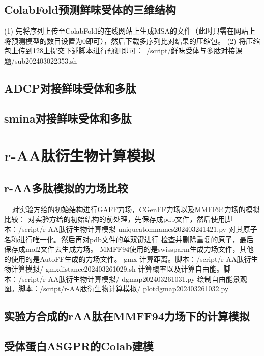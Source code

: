 \subsection{ColabFold预测鲜味受体的三维结构}
(1) 先将序列上传至ColabFold的在线网站上生成MSA的文件（此时只需在网站上将预测模型的数目设置为0即可），然后下载多序列比对结果的压缩包。
\newline\indent (2) 将压缩包上传到128上提交下述脚本进行预测即可：~/script/鲜味受体与多肽对接课题/sub202403022353.sh
\subsection{ADCP对接鲜味受体和多肽}
\subsection{smina对接鲜味受体和多肽}
\section{r-AA肽衍生物计算模拟}
\subsection{r-AA多肽模拟的力场比较}
\noindent = 对实验方给的初始结构进行GAFF力场，CGenFF力场以及MMFF94力场的模拟比较：
\newline\indent 对实验方给的初始结构的前处理，先保存成pdb文件，然后使用脚本：/script/r-AA肽衍生物计算模拟 uniqueatomnames202403241421.py 对其原子名称进行唯一化。然后再对pdb文件的单双键进行
检查并删除重复的原子，最后保存成mol2文件去生成力场。
\newline\indent MMFF94使用的是swissparm生成力场文件，其他的使用的是AutoFF生成的力场文件。
\newline\indent gmx 计算距离。脚本：/script/r-AA肽衍生物计算模拟/ gmxdistance202403261029.sh
\newline\indent 计算概率以及计算自由能。脚本：/script/r-AA肽衍生物计算模拟/ dgmap202403261031.py
\newline\indent 绘制自由能景观图。脚本：/script/r-AA肽衍生物计算模拟/ plotdgmap202403261032.py
\subsection{实验方合成的rAA肽在MMFF94力场下的计算模拟}
\subsection{受体蛋白ASGPR的Colab建模}
